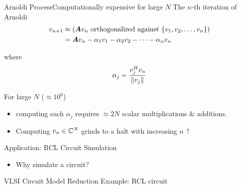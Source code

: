 \documentclass{beamer}
\begin{document}
\begin{frame}{Arnoldi Process}{Computationally expensive for large $N$} 
  The $n$-th iteration of Arnoldi 
\begin{align*}	
   v_{n+1} &\approx \left(\A v_{n}\ \text{orthogonalized against}\ \{v_1,v_2,\ldots ,v_{n}\}\right)\\
	&= \A v_n - \alpha_1 v_1 - \alpha_2 v_2 - \cdots - \alpha_n v_n
\end{align*}

where \[ \alpha_j = \frac{v_j^H v_n}{\left\| v_j \right\|_{}} \] 
  
	\bigskip
For large $N$  ($\approx 10^6$)
\begin{itemize}
 \item computing each $\alpha_j$ requires $\approx2N$ scalar multiplications \& additions.
 \item Computing $v_n\in\mathbb{C}^N$ grinds to a halt with increasing $n$\ !
\end{itemize}

\end{frame}



\begin{frame}{Application: RCL Circuit Simulation}
	\begin{figure}
	 	    \centering
	\end{figure}
	\begin{itemize}
	\item Why simulate a circuit?
	\end{itemize}
\end{frame}




\begin{frame}{VLSI Circuit Model Reduction}
Example: RCL circuit
	\begin{figure}
	 	    \centering
	\end{figure}
\end{frame}
\end{document}

